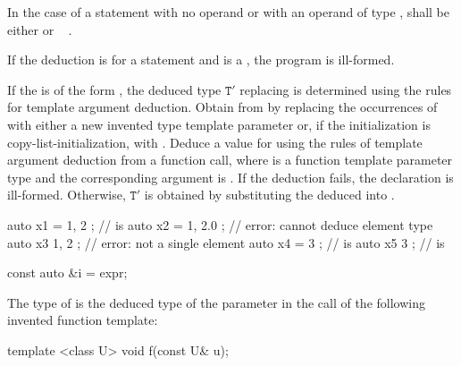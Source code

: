 In the case of a  statement with no operand
or with an operand of type ,
 shall be either
  or
\cv{}~ .

\pnum
If the deduction is for a  statement
and  is a ,
the program is ill-formed.

\pnum
If the  is of the form
 ,
the deduced type
$\mathtt{T}'$ replacing 
is determined using the rules for template argument deduction.
Obtain  from
 by replacing the occurrences of
  with either
a new invented type template parameter  or,
if the initialization is copy-list-initialization, with
. Deduce a value for  using the rules
of template argument deduction from a function call,
where  is a
function template parameter type and
the corresponding argument is .
If the deduction fails, the declaration is ill-formed.
Otherwise, $\mathtt{T}'$ is obtained by
substituting the deduced  into .
\begin{example}
\begin{codeblock}
auto x1 = { 1, 2 };             //  is 
auto x2 = { 1, 2.0 };           // error: cannot deduce element type
auto x3{ 1, 2 };                // error: not a single element
auto x4 = { 3 };                //  is 
auto x5{ 3 };                   //  is 
\end{codeblock}
\end{example}

\begin{example}
\begin{codeblock}
const auto &i = expr;
\end{codeblock}
The type of  is the deduced type of the parameter  in
the call  of the following invented function template:
\begin{codeblock}
template <class U> void f(const U& u);
\end{codeblock}
\end{example}

